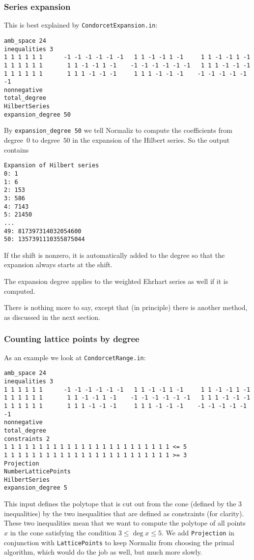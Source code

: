 \documentclass[12pt,a4paper]{scrartcl}
\theoremstyle{definition}
\begin{document}
\subsubsection{Series expansion}
This is best explained by \verb|CondorcetExpansion.in|:
\begin{Verbatim}
amb_space 24
inequalities 3
1 1 1 1 1 1      -1 -1 -1 -1 -1 -1   1 1 -1 -1 1 -1     1 1 -1 -1 1 -1
1 1 1 1 1 1       1 1 -1 -1 1 -1    -1 -1 -1 -1 -1 -1   1 1 1 -1 -1 -1
1 1 1 1 1 1       1 1 1 -1 -1 -1     1 1 1 -1 -1 -1    -1 -1 -1 -1 -1 -1
nonnegative
total_degree
HilbertSeries
expansion_degree 50
\end{Verbatim}
By \verb|expansion_degree 50| we tell Normaliz to compute the coefficients from degree~$0$ to degree~$50$ in the expansion of the Hilbert series. So the output contains
\begin{Verbatim}
Expansion of Hilbert series
0: 1
1: 6
2: 153
3: 586
4: 7143
5: 21450
...
49: 817397314032054600
50: 1357391110355875044
\end{Verbatim}
If the shift is nonzero, it is automatically added to the degree so that the expansion always starts at the shift.

The expansion degree applies to the weighted Ehrhart series as well if it is computed.

There is nothing more to say, except that (in principle) there is another method, as discussed in the next section.

\subsubsection{Counting lattice points by degree}\label{count}

As an example we look at \verb|CondorcetRange.in|:
\begin{Verbatim}
amb_space 24
inequalities 3
1 1 1 1 1 1      -1 -1 -1 -1 -1 -1   1 1 -1 -1 1 -1     1 1 -1 -1 1 -1
1 1 1 1 1 1       1 1 -1 -1 1 -1    -1 -1 -1 -1 -1 -1   1 1 1 -1 -1 -1
1 1 1 1 1 1       1 1 1 -1 -1 -1     1 1 1 -1 -1 -1    -1 -1 -1 -1 -1 -1
nonnegative
total_degree
constraints 2
1 1 1 1 1 1 1 1 1 1 1 1 1 1 1 1 1 1 1 1 1 1 1 1 <= 5
1 1 1 1 1 1 1 1 1 1 1 1 1 1 1 1 1 1 1 1 1 1 1 1 >= 3
Projection
NumberLatticePoints
HilbertSeries
expansion_degree 5
\end{Verbatim}
This input defines the polytope that is cut out from the cone (defined by the $3$ inequalities) by the two inequalities that are defined as constraints (for clarity). These two inequalities mean that we want to compute the polytope of all points $x$ in the cone satisfying the condition $3\le \deg x \le 5$. We add \verb|Projection| in conjunction with \verb|LatticePoints| to keep Normaliz from choosing the primal algorithm, which would do the job as well, but much more slowly.
\end{document}
